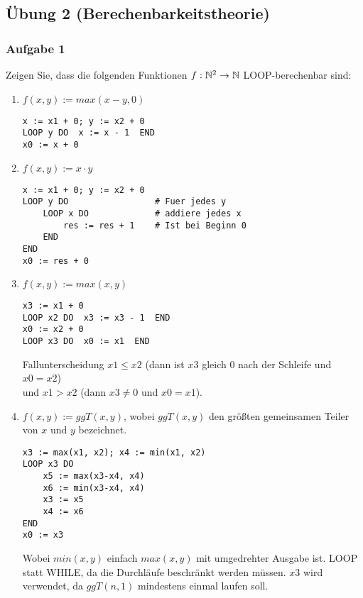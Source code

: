 
\newpage
\subsection*{Übung 2 (Berechenbarkeitstheorie)}
\subsubsection*{Aufgabe 1}
Zeigen Sie, dass die folgenden Funktionen $f: \mathbb{N}^{2} \to \mathbb{N}$ LOOP-berechenbar sind:

    \begin{enumerate}
        \item $f(x,y) := max(x-y, 0)$
            \begin{lstlisting}
x := x1 + 0; y := x2 + 0
LOOP y DO  x := x - 1  END
x0 := x + 0
            \end{lstlisting}

        \item $f(x,y) := x \cdot y$
            \begin{lstlisting}
x := x1 + 0; y := x2 + 0
LOOP y DO                 # Fuer jedes y
    LOOP x DO             # addiere jedes x
        res := res + 1    # Ist bei Beginn 0
    END
END
x0 := res + 0
            \end{lstlisting}

        \item $f(x,y) := max(x,y)$
            \begin{lstlisting}
x3 := x1 + 0
LOOP x2 DO  x3 := x3 - 1  END
x0 := x2 + 0
LOOP x3 DO  x0 := x1  END
            \end{lstlisting}

            Fallunterscheidung $x1 \leq x2$ (dann ist $x3$ gleich $0$ nach der Schleife und $x0 = x2$) \\ und $x1 > x2$ (dann $x3 \neq 0$ und $x0 = x1$).

        \item $f(x,y) := ggT(x,y)$, wobei $ggT(x,y)$ den größten gemeinsamen Teiler von $x$ und $y$ bezeichnet.
            \begin{lstlisting}
x3 := max(x1, x2); x4 := min(x1, x2)
LOOP x3 DO
    x5 := max(x3-x4, x4)
    x6 := min(x3-x4, x4)
    x3 := x5
    x4 := x6
END
x0 := x3
            \end{lstlisting}

            Wobei $min(x,y)$ einfach $max(x, y)$ mit umgedrehter Ausgabe ist. LOOP statt WHILE, da die Durchläufe beschränkt werden müssen. $x3$ wird verwendet, da $ggT(n,1)$ mindestens einmal laufen soll.
    \end{enumerate}


